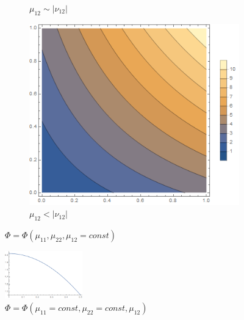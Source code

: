 \documentclass[12pt,a4]{article}
\begin{document}
\begin{figure}[!ht]
\begin{subfigure}[b]{0.3\textwidth}
		\caption{$ \mu_{12} \sim | \nu_{12}| $}
	\end{subfigure}
	\hfill
	\begin{subfigure}[b]{0.3\textwidth}
		\centering
		\includegraphics[width=\textwidth]{Joonised/PhiMu11Mu22III}
		\caption{$ \mu_{12} < | \nu_{12}| $}
	\end{subfigure}
	\caption{$ \Phi = \Phi (\mu_{11}, \mu_{22}, \mu_{12} = const) $}
\end{figure}
\begin{figure}[!ht]
	\centering
	\includegraphics[width=0.3\textwidth]{Joonised/PhiMu12}
	\caption{$ \Phi = \Phi (\mu_{11} = const, \mu_{22} = const, \mu_{12}) $}
\end{figure}
\end{document}
